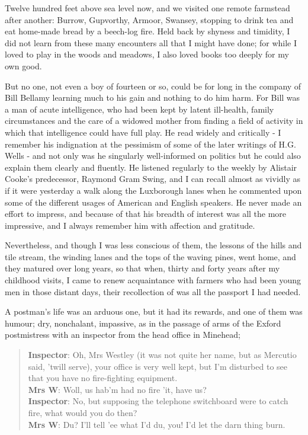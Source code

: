 Twelve hundred feet above sea level now, and we visited one remote farmstead after another: Burrow, Gupvorthy, Armoor, Swansey, stopping to drink tea and eat home-made bread by a beech-log fire. Held back by shyness and timidity, I did not learn from these many encounters all that I might have done; for while I loved to play in the woods and meadows, I also loved books too deeply for my own good.

But no one, not even a boy of fourteen or so, could be for long in the company of Bill Bellamy learning much to his gain and nothing to do him harm. For Bill was a man of acute intelligence, who had been kept by latent ill-health, family circumstances and the care of a widowed mother from finding a field of activity in which that intelligence could have full play. He read widely and critically - I remember his indignation at the  pessimism of some of the later writings of H.G. Wells - and not only was he singularly well-informed on politics but he could also explain them clearly and fluently. He listened regularly to the weekly  by Alistair Cooke's predecessor, Raymond Gram Swing, and I can recall almost as vividly as if it were yesterday a walk along the Luxborough lanes when he commented upon some of the different usages of American and English speakers. He never made an effort to impress, and because of that his breadth of interest was all the more impressive, and I always remember him with affection and gratitude.

Nevertheless, and though I was less conscious of them, the lessons of the hills and tile stream, the winding lanes and the tops of the waving pines, went home, and they matured over long years, so that when, thirty and forty years after my childhood visits, I came to renew acquaintance with farmers who had been young men in those distant days, their recollection of  was all the passport I had needed.

A postman's life was an arduous one, but it had its rewards, and one of them was humour; dry, nonchalant, impassive, as in the passage of arms of the Exford postmistress with an inspector from the head office in Minehead;

\begin{quotation}
\textbf{Inspector}: Oh, Mrs Westley (it was not quite her name, but as Mercutio said, 'twill serve), your office is very well kept, but I'm disturbed to see that you have no fire-fighting equipment. \\
\textbf{Mrs W}: Woll, us hab'm had no fire 'it, have us? \\
\textbf{Inspector}: No, but supposing the telephone switchboard were to catch fire, what would you do then? \\
\textbf{Mrs W}: Du? I'll tell 'ee what I'd du, you! I'd let the darn thing burn. \\
\end{quotation}

